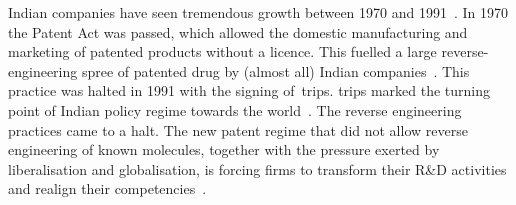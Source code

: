 Indian \pharma companies have seen tremendous growth between 1970 and 1991~\citep{Chaturvedi:2006da,Bruche:2011uf}.
In 1970 the Patent Act was passed, which allowed the domestic manufacturing and marketing of patented products without a licence.
This fuelled a large reverse-engineering spree of patented drug by (almost all) Indian \pharma companies~\citep{Bruche:2011uf}.
This practice was halted in 1991 with the signing of~\gls{trips}. 
\gls{trips} marked the turning point of Indian policy regime towards the world~\citep{Chaturvedi:2006da}.
The reverse engineering practices came to a halt. 
The new patent regime that did not allow reverse engineering of known molecules, together with the pressure exerted by liberalisation and globalisation, is forcing firms to transform their R\&D activities and realign their competencies~\citep{Chaturvedi:2006da}.

